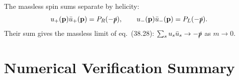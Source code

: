 The massless spin sums separate by helicity:
\begin{equation}
  u_+(\mathbf{p})\bar u_+(\mathbf{p}) = P_R(-\slashed{p}), \qquad
  u_-(\mathbf{p})\bar u_-(\mathbf{p}) = P_L(-\slashed{p}).
\end{equation}
Their sum gives the massless limit of eq.~(38.28): $\sum_s u_s\bar u_s \to -\slashed{p}$ as $m\to 0$.


\section{Numerical Verification Summary}

